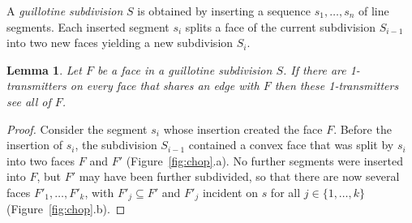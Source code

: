 \documentclass{article}
\newtheorem{lem}{Lemma}
\begin{document}
A \emph{guillotine subdivision} $S$ is obtained by inserting a sequence 
$s_1,\ldots,s_n$ of line segments.  Each inserted segment $s_i$ splits a face of
the current subdivision $S_{i-1}$ into two new faces yielding a new subdivision $S_i$.

\begin{lem}\label{lem:chop}
Let $F$ be a face in a guillotine subdivision $S$.  If there are
1-transmitters on every face that shares an edge with $F$ then these
1-transmitters see all of $F$.
\end{lem}

\begin{proof}
Consider the segment $s_i$ whose insertion created the face $F$.
Before the insertion of $s_i$, the subdivision $S_{i-1}$ contained
a convex face that was split by $s_i$ into two faces $F$ and $F'$
(Figure~\ref{fig:chop}.a).  No further segments were inserted into
$F$, but $F'$ may have been further subdivided, so that there are now
several faces $F'_1,\ldots,F'_k$, with $F'_j\subseteq F'$ and $F'_j$ incident on $s$ for all $j\in\{1,\ldots,k\}$
(Figure~\ref{fig:chop}.b).


\end{proof}
\end{document}
